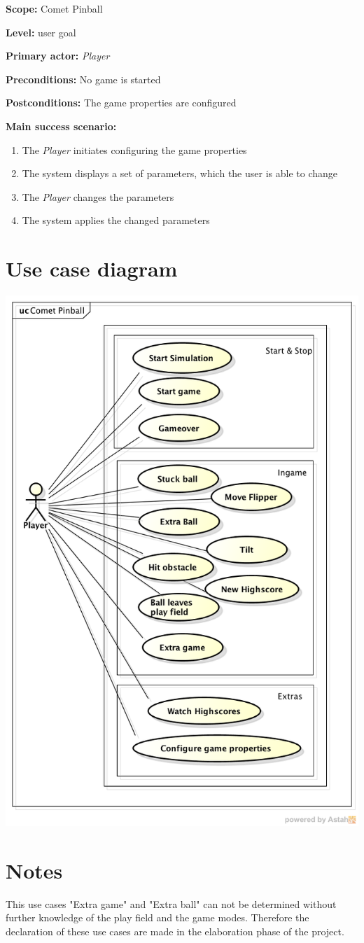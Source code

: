 \documentclass[fontsize=12pt,
               paper=a4,
               twoside=false,
               parskip=half,
               ]{scrartcl}
\begin{document}
\textbf{\textsf{Scope:}} Comet Pinball

\textbf{\textsf{Level:}} user goal

\textbf{\textsf{Primary actor:}} \emph{Player}

\textbf{\textsf{Preconditions:}} No game is started

\textbf{\textsf{Postconditions:}} The game properties are configured

\textbf{\textsf{Main success scenario:}}

\begin{enumerate}[leftmargin=3em]
	\item The \emph{Player} initiates configuring the game properties
	\item The system displays a set of parameters, which the user is able to change
	\item The \emph{Player} changes the parameters
	\item The system applies the changed parameters
\end{enumerate}

\section{Use case diagram}
			
\includegraphics[width=15cm]{./img/usecase-model.png}

\section{Notes}
This use cases "Extra game" and "Extra ball" can not be determined without further knowledge of the play field and the game modes.
Therefore the declaration of these use cases are made in the elaboration phase of the project.	
\end{document}

